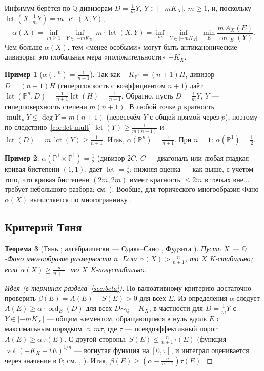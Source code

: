 \documentclass[11pt,a4paper]{article}
\theoremstyle{plain}
\newtheorem{theorem}{Теорема}[section]
\theoremstyle{definition}
\newtheorem{example}[theorem]{Пример}
\theoremstyle{remark}
\newcommand{\Q}{\mathbb{Q}}
\newcommand{\PP}{\mathbb{P}}
\DeclareMathOperator{\ord}{ord}
\DeclareMathOperator{\vol}{vol}
\DeclareMathOperator{\lct}{lct}
\DeclareMathOperator{\mult}{mult}
\begin{document}
Инфимум берётся по $\Q$-дивизорам $D=\frac1mY$, $Y\in|-mK_X|$, $m\ge1$, и, поскольку
$\lct(X,\frac1mY)=m\,\lct(X,Y)$,
\[
\alpha(X)=\inf_{m\ge1}\ \inf_{Y\in|-mK_X|}m\cdot\lct(X,Y)
=\inf_{m}\ \inf_{Y\in|-mK_X|}\ \min_{E}\frac{m\,A_X(E)}{\ord_E(Y)} .
\]
Чем больше $\alpha(X)$, тем «менее особыми» могут быть антиканонические дивизоры; это глобальная
мера «положительности» $-K_X$.

\begin{example}[$\alpha(\PP^n)=\frac1{n+1}$]\label{ex:alpha-Pn}
Так как $-K_{\PP^n}=(n+1)H$, дивизор $D=(n+1)H$ (гиперплоскость с коэффициентом $n+1$) даёт
$\lct(\PP^n,D)=\frac1{n+1}\lct(H)=\frac1{n+1}$. Обратно, пусть $D=\frac1mY$, $Y$ --- гиперповерхность
степени $m(n+1)$. В любой точке $p$ кратность $\mult_pY\le\deg Y=m(n+1)$ (пересечём $Y$ с общей
прямой через $p$), поэтому по следствию~\ref{cor:lct-mult} $\lct(Y)\ge\frac1{m(n+1)}$ и
$\lct(D)=m\,\lct(Y)\ge\frac1{n+1}$. Итак, $\alpha(\PP^n)=\frac1{n+1}$. При $n=1$: $\alpha(\PP^1)=\frac12$.
\end{example}

\begin{example}
$\alpha(\PP^1\times\PP^1)=\frac12$ (дивизор $2C$, $C$ --- диагональ или любая гладкая кривая
бистепени $(1,1)$, даёт $\lct=\frac12$; нижняя оценка --- как выше, с учётом того, что кривая
бистепени $(2m,2m)$ имеет кратность $\le2m$ в точках вне... требует небольшого разбора; см.
\cite{Che08}). Вообще, для торического многообразия Фано $\alpha(X)$ вычисляется по многограннику
\cite{Song}.
\end{example}

\subsection{Критерий Тяня}

\begin{theorem}[{Тянь \cite{Tia87}; алгебраически --- Одака--Сано \cite{OS12}, Фудзита \cite{Fuj19a}}]\label{thm:Tian-alpha}
Пусть $X$ --- $\Q$-Фано многообразие размерности $n$. Если $\alpha(X)>\frac n{n+1}$, то $X$
K-стабильно; если $\alpha(X)\ge\frac n{n+1}$, то $X$ K-полустабильно.
\end{theorem}

\begin{proof}[Идея (в терминах раздела~\ref{sec:beta})]
По валюативному критерию достаточно проверить $\beta(E)=A(E)-S(E)>0$ для всех $E$. Из определения
$\alpha$ следует $A(E)\ge\alpha\cdot\ord_E(D)$ для всех $D\sim_\Q-K_X$, в частности для
$D=\frac1mY$ с $Y\in|-mK_X|$ --- общим элементом, обращающимся в нуль вдоль $E$ с максимальным
порядком $\approx m\tau$, где $\tau$ --- псевдоэффективный порог: $A(E)\ge\alpha\,\tau(E)$. С другой
стороны, $S(E)\le\frac n{n+1}\tau(E)$ (функция $\vol(-K_X-tE)^{1/n}$ ---
вогнутая функция на $[0,\tau]$, и интеграл оценивается через значение в $0$; см.
\cite{Fuj19b}, \cite[\S\,7]{BJ}). Итак, $\beta(E)\ge(\alpha-\frac n{n+1})\tau(E)$.
\end{proof}
\end{document}
